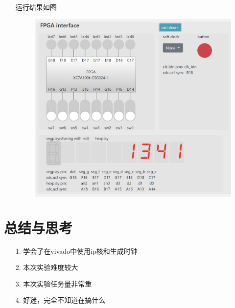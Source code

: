 \documentclass{article}
\begin{document}
\begin{enumerate}
        \clearpage
        \item []运行结果如图
        \begin{figure}[htbp]
            \centering
            \includegraphics[scale=0.7]{r3.png}
        \end{figure}
    \end{enumerate}

	\clearpage
    \section{总结与思考}
	\begin{enumerate}
		\item [1.]学会了在vivado中使用ip核和生成时钟
		\item [2.]本次实验难度较大
		\item [3.]本次实验任务量非常重
		\item [4.]好迷，完全不知道在搞什么
	\end{enumerate}
\end{document}
